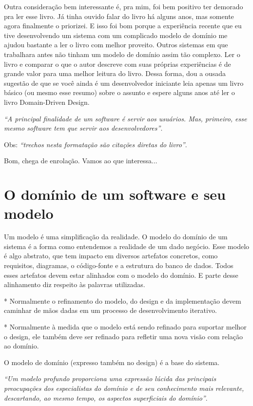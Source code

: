 \documentclass[a4paper, 12pt]{article}
\newcommand{\citacao}[1]{\emph{``#1''}}
\begin{document}
Outra consideração bem interessante é, pra mim, foi bem positivo ter demorado pra ler esse livro. Já tinha ouvido falar do livro há alguns anos, mas somente agora finalmente o priorizei. E isso foi bom porque a experiência recente que eu tive desenvolvendo um sistema com um complicado modelo de domínio me ajudou bastante a ler o livro com melhor proveito. Outros sistemas em que trabalhara antes não tinham um modelo de domínio assim tão complexo. Ler o livro e comparar o que o autor descreve com suas próprias experiências é de grande valor para uma melhor leitura do livro. Dessa forma, dou a ousada sugestão de que se você ainda é um desenvolvedor iniciante leia apenas um livro básico (ou mesmo esse resumo) sobre o assunto e espere alguns anos até ler o livro Domain-Driven Design.

\citacao{A principal finalidade de um software é servir aos usuários. Mas, primeiro, esse mesmo software tem que servir aos desenvolvedores}.

Obs: \citacao{trechos nesta formatação são citações diretas do livro}.

Bom, chega de enrolação. Vamos ao que interessa...

\section{O domínio de um software e seu modelo}


Um modelo é uma simplificação da realidade. O modelo do domínio de um sistema é a forma como entendemos a realidade de um dado negócio. Esse modelo é algo abstrato, que tem impacto em diversos artefatos concretos, como requisitos, diagramas, o código-fonte e a estrutura do banco de dados. Todos esses artefatos devem estar alinhados com o modelo do domínio. E parte desse alinhamento diz respeito às palavras utilizadas. 

* Normalmente o refinamento do modelo, do design e da implementação devem caminhar de mãos dadas em um processo de desenvolvimento iterativo.

* Normalmente à medida que o modelo está sendo refinado para suportar melhor o design, ele também deve ser refinado para refletir uma nova visão com relação ao domínio.

O modelo de domínio (expresso também no design) é a base do sistema.

\citacao{Um modelo profundo proporciona uma expressão lúcida das principais preocupações dos especialistas do domínio e de seu conhecimento mais relevante, descartando, ao mesmo tempo, os aspectos superficiais do domínio}.
\end{document}
